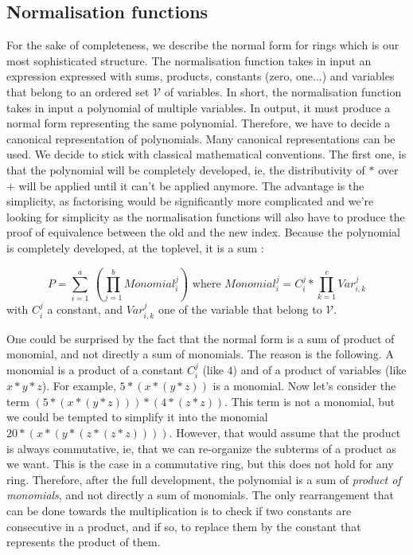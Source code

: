 \subsection{Normalisation functions}
\label{sect:normalFormShape}

For the sake of completeness, we describe the normal form for rings which is our most sophisticated structure.
The normalisation function takes in input an expression expressed with sums, products, constants (zero, one...) and variables that belong to an ordered set $\mathcal{V}$ of variables. In short, the normalisation function takes in input a polynomial of multiple variables. In output, it must produce a normal form representing the same polynomial. Therefore, we have to decide a canonical representation of polynomials. Many canonical representations can be used. We decide to stick with classical mathematical conventions. The first one, is that the polynomial will be completely developed, ie, the distributivity of $*$ over $+$ will be applied until it can't be applied anymore. The advantage is the simplicity, as factorising would be significantly more complicated and we're looking for simplicity as the normalisation functions will also have to produce the proof of equivalence between the old and the new index. Because the polynomial is completely developed, at the toplevel, it is a sum :

\[
P = \sum_{i=1}^{a}\ (\prod_{j=1}^{b} Monomial_{i}^j)
\text{ where } 
Monomial_{i}^j = C_{i}^j * \prod_{k=1}^{c} Var_{i,k}^{j}
\]
with $C_{i}^j$ a constant, and $Var_{i,k}^{j}$ one of the variable that belong to $\mathcal{V}$.

One could be surprised by the fact that the normal form is a sum of product of monomial, and not directly a sum of monomials. The reason is the following. A monomial is a product of a constant $C_{i}^j$ (like $4$) and of a product of variables (like $x*y*z$). For example,  $5*(x*(y*z))$ is a monomial. Now let's consider the term $(5*(x*(y*z))) * (4*(z*z))$. This term is not a monomial, but we could be tempted to simplify it into the monomial $20*(x*(y*(z*(z*z))))$. However, that would assume that the product is always commutative, ie, that we can re-organize the subterms of a product as we want. This is the case in a commutative ring, but this does not hold for any ring. Therefore, after the full development, the polynomial is a sum of \emph{product of monomials}, and not directly a sum of monomials. The only rearrangement that can be done towards the multiplication is to check if two constants are consecutive in a product, and if so, to replace them by the constant that represents the product of them.

